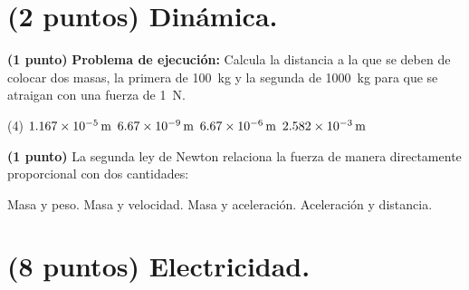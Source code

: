 \documentclass[12pt, letter]{exam}
\begin{document}


\newpage

\begin{questions}
    \section{(2 puntos) Dinámica.}

    \question \textbf{(1 punto)} \label{Problema_01} \textbf{Problema de ejecución: } Calcula la distancia a la que se deben de colocar dos masas, la primera de \SI{100}{\kilo\gram} y la segunda de \SI{1000}{\kilo\gram} para que se atraigan con una fuerza de \SI{1}{\newton}.
    \begin{tasks}(4)
        \task $\SI{1.167d-5}{\meter}$
        \task $\SI{6.67d-9}{\meter}$
        \task $\SI{6.67d-6}{\meter}$
        \task $\SI{2.582d-3}{\meter}$
    \end{tasks}
    \question \textbf{(1 punto)} La segunda ley de Newton relaciona la fuerza de manera directamente proporcional con dos cantidades:
    \begin{multicols}{2}
    \begin{tasks}
        \task Masa y peso.
        \task Masa y velocidad.
        \task Masa y aceleración.
        \task Aceleración y distancia.
    \end{tasks}
    \end{multicols}
    

    \section{(8 puntos) Electricidad.}


\end{questions}
\end{document}
